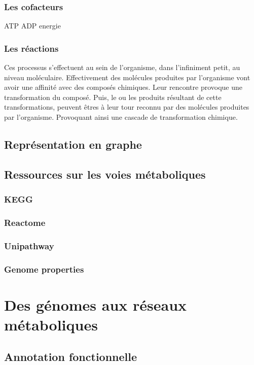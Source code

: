 \begin{refsection}
    
    \subsubsection{Les cofacteurs}
    ATP ADP energie
    
    
    \subsubsection{Les réactions}
    Ces processus s'effectuent au sein de l'organisme, dans l'infiniment petit, au niveau moléculaire. Effectivement des molécules produites par l'organisme vont avoir une affinité avec des composés chimiques. Leur rencontre provoque une transformation du composé. Puis, le ou les produits résultant de cette transformations, peuvent êtres à leur tour reconnu par des molécules produites par l'organisme. Provoquant ainsi une cascade de transformation chimique.
    
    \subsection{Représentation en graphe}
    \subsection{Ressources sur les voies métaboliques}
    \subsubsection{KEGG}
    \subsubsection{Reactome}
    \subsubsection{Unipathway}
    \subsubsection{Genome properties}
    
    \section{Des génomes aux réseaux métaboliques}
    \subsection{Annotation fonctionnelle}

\end{refsection}
